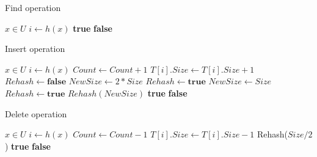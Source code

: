 \begin{algorithm}[p]
\caption{Find operation}
\label{algorithm-find}
\begin{algorithmic}
\REQUIRE $x \in U$
\STATE
$i \leftarrow h(x)$
	\RETURN \textbf{true} 
\ELSE
	\RETURN \textbf{false} 
\ENDIF
\end{algorithmic}
\end{algorithm}

\begin{algorithm}[ph!]
\caption{Insert operation}
\label{algorithm-insert}
\begin{algorithmic}
\REQUIRE $x \in U$
\STATE
$i \leftarrow h(x)$
	\STATE $Count \leftarrow Count + 1$
	\STATE $T[i].Size \leftarrow T[i].Size + 1$
	\STATE
	\STATE $Rehash \leftarrow \mathbf{false}$
		\STATE $NewSize \leftarrow 2 * Size$
		\STATE $Rehash \leftarrow \mathbf{true}$
	\ELSE
		\STATE $NewSize \leftarrow Size$	
	\ENDIF
	\STATE
		\STATE $Rehash \leftarrow \mathbf{true}$
	\ENDIF
	\STATE
		\STATE $Rehash(NewSize)$
	\ENDIF
	\STATE
	\RETURN \textbf{true} 
\ELSE
	\RETURN \textbf{false} 
\ENDIF
\end{algorithmic}
\end{algorithm}

\begin{algorithm}[ph!]
\caption{Delete operation}
\label{algorithm-delete}
\begin{algorithmic}
\REQUIRE $x \in U$
\STATE
$i \leftarrow h(x)$
	\STATE $Count \leftarrow Count - 1$
	\STATE $T[i].Size \leftarrow T[i].Size - 1$
	\STATE
		\STATE Rehash($Size / 2$)
	\ENDIF
	\STATE
	\RETURN \textbf{true} 
\ELSE
	\RETURN \textbf{false} 
\ENDIF
\end{algorithmic}
\end{algorithm}

